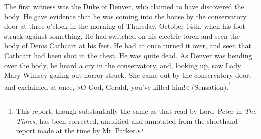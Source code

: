 The first witness was the Duke of Denver, who claimed to have discovered the body. He gave evidence that he was coming into the house by the conservatory door at three o'clock in the morning of Thursday, October 14th, when his foot struck against something. He had switched on his electric torch and seen the body of Denis Cathcart at his feet.  He had at once turned it over, and seen that Cathcart had been shot in the chest. He was quite dead. As Denver was bending over the body, he heard a cry in the conservatory, and, looking up, saw Lady Mary Wimsey gazing out horror-struck. She came out by the conservatory door, and exclaimed at once, »O God, Gerald, you've killed him!« (Sensation).\footnote{This report, though substantially the same as that read by Lord~Peter in \textit{The Times}, has been corrected, amplified and annotated from the shorthand report made at the time by Mr~Parker.}

